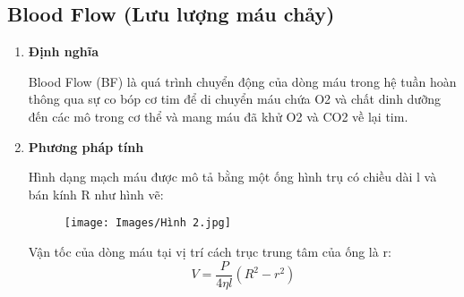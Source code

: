 \documentclass[12pt,a4paper]{article}
\begin{document}
\subsection{Blood Flow (Lưu lượng máu chảy)}
\begin{enumerate} [a/]
	\item \textbf{Định nghĩa}
	      \begin{flushleft}
		      Blood Flow (BF) là quá trình chuyển động của dòng máu trong hệ tuần hoàn thông qua sự co bóp cơ tim để di chuyển máu chứa O2 và chất dinh dưỡng đến các mô trong cơ thể và mang máu đã khử O2 và CO2 về lại tim.
	      \end{flushleft}
	\item \textbf{Phương pháp tính }
	      \begin{flushleft}
		      Hình dạng mạch máu được mô tả bằng một ống hình trụ có chiều dài l và bán kính R như hình vẽ:\\
	        \begin{figure} [ht]
            \centering
            \texttt{[image: Images/Hình 2.jpg]}
            \caption{}
            \label{fig:enter-label}
        \end{figure}
		      Vận tốc của dòng máu tại vị trí cách trục trung tâm của ống là r: $$V=\frac{P}{4\eta l}(R^2-r^2)$$ \\


\end{flushleft}
\end{enumerate}
\end{document}
